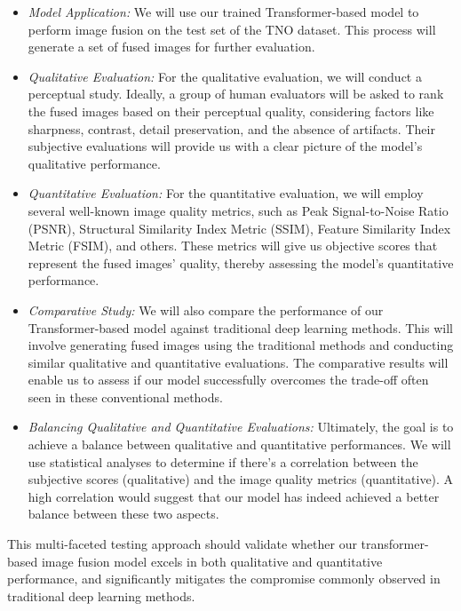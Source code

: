 \begin{itemize}
    \item \textit{Model Application:} We will use our trained Transformer-based model to perform image fusion on the test set of the TNO dataset. This process will generate a set of fused images for further evaluation.

    \item \textit{Qualitative Evaluation:} For the qualitative evaluation, we will conduct a perceptual study. Ideally, a group of human evaluators will be asked to rank the fused images based on their perceptual quality, considering factors like sharpness, contrast, detail preservation, and the absence of artifacts. Their subjective evaluations will provide us with a clear picture of the model's qualitative performance.

    \item \textit{Quantitative Evaluation:} For the quantitative evaluation, we will employ several well-known image quality metrics, such as Peak Signal-to-Noise Ratio (PSNR), Structural Similarity Index Metric (SSIM), Feature Similarity Index Metric (FSIM), and others. These metrics will give us objective scores that represent the fused images' quality, thereby assessing the model's quantitative performance.

    \item \textit{Comparative Study:} We will also compare the performance of our Transformer-based model against traditional deep learning methods. This will involve generating fused images using the traditional methods and conducting similar qualitative and quantitative evaluations. The comparative results will enable us to assess if our model successfully overcomes the trade-off often seen in these conventional methods.

    \item \textit{Balancing Qualitative and Quantitative Evaluations:} Ultimately, the goal is to achieve a balance between qualitative and quantitative performances. We will use statistical analyses to determine if there's a correlation between the subjective scores (qualitative) and the image quality metrics (quantitative). A high correlation would suggest that our model has indeed achieved a better balance between these two aspects.

\end{itemize}

This multi-faceted testing approach should validate whether our transformer-based image fusion model excels in both qualitative and quantitative performance, and significantly mitigates the compromise commonly observed in traditional deep learning methods.


